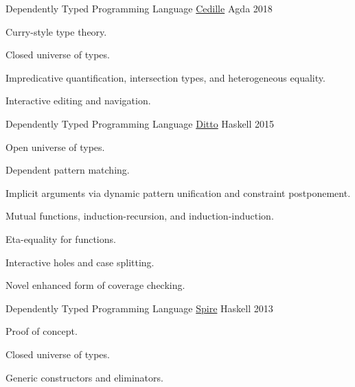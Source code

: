 

\begin{cventries}

  \cventry
    {Dependently Typed Programming Language} %
    {\href{https://github.com/cedille/cedille}{Cedille}} %
    {Agda} %
    {2018} %
    {
      \begin{cvitems} %
        \item {Curry-style type theory.}
        \item {Closed universe of types.}
        \item {Impredicative quantification, intersection types, and heterogeneous equality.}
        \item {Interactive editing and navigation.}
      \end{cvitems}
    }

  \cventry
    {Dependently Typed Programming Language} %
    {\href{https://github.com/ditto/ditto}{Ditto}} %
    {Haskell} %
    {2015} %
    {
      \begin{cvitems} %
        \item {Open universe of types.}
        \item {Dependent pattern matching.}
        \item {Implicit arguments via dynamic pattern unification and constraint postponement.}
        \item {Mutual functions, induction-recursion, and induction-induction.}
        \item {Eta-equality for functions.}
        \item {Interactive holes and case splitting.}
        \item {Novel enhanced form of coverage checking.}
      \end{cvitems}
    }

  \cventry
    {Dependently Typed Programming Language} %
    {\href{https://github.com/spire/spire}{Spire}} %
    {Haskell} %
    {2013} %
    {
      \begin{cvitems} %
        \item {Proof of concept.}
        \item {Closed universe of types.}
        \item {Generic constructors and eliminators.}
      \end{cvitems}
    }


\end{cventries}
